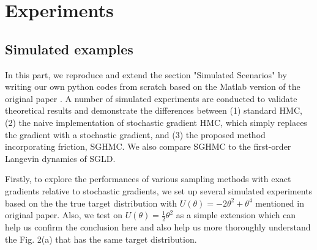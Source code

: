 
\section{Experiments}

\subsection{Simulated examples}
In this part, we reproduce and extend the section "Simulated Scenarios" by writing our own python codes from scratch based on the Matlab version of the original paper \cite{simu_code}. A number of simulated experiments are conducted to validate theoretical results and demonstrate the differences between (1) standard HMC, (2) the naive implementation of stochastic gradient HMC, which simply replaces the gradient with a stochastic gradient, and (3) the proposed method incorporating friction, SGHMC. We also compare SGHMC to the first-order Langevin dynamics of SGLD.

Firstly, to explore the performances of various sampling methods with exact gradients relative to stochastic gradients, we set up several simulated experiments based on the the true target distribution with $U(\theta) = -2\theta^2 + \theta^4$ mentioned in original paper. Also, we test on $U(\theta) = \frac{1}{2}\theta^2$ as a simple extension which can help us confirm the conclusion here and also help us more thoroughly understand the Fig. 2(a) that has the same target distribution. 

